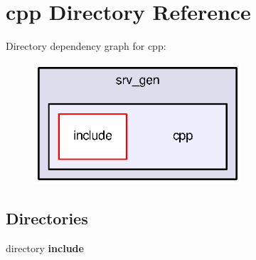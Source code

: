 \section{cpp Directory Reference}
\label{dir_c57bffe54e50c3f30a7a5452650bfd57}
Directory dependency graph for cpp\-:\nopagebreak
\begin{figure}[H]
\begin{center}
\leavevmode
\includegraphics[width=218pt]{dir_c57bffe54e50c3f30a7a5452650bfd57_dep}
\end{center}
\end{figure}
\subsection*{Directories}
\begin{DoxyCompactItemize}
\item 
directory {\bf include}
\end{DoxyCompactItemize}
